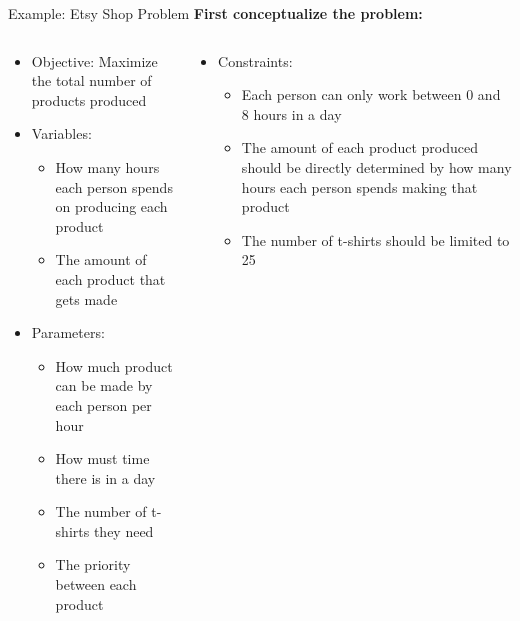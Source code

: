 \documentclass[10pt, aspectratio=169]{beamer}
\begin{document}
\begin{frame}{Example: Etsy Shop Problem}
    \textbf{First conceptualize the problem:}
    \begin{columns}[t]
        \begin{column}[t]{0.5\textwidth}
            \begin{itemize}
                \item Objective: Maximize the total number of products produced
                \item Variables: 
                \begin{itemize}
                    \item How many hours each person spends on producing each product
                    \item The amount of each product that gets made
                \end{itemize}
                
                \item Parameters: 
                \begin{itemize}
                    \item How much product can be made by each person per hour
                    \item How must time there is in a day
                    \item The number of t-shirts they need
                    \item The priority between each product
                \end{itemize}
            \end{itemize}
        \end{column}
        \begin{column}[t]{0.5\textwidth}
            \begin{itemize}
                \item Constraints:
                \begin{itemize}
                    \item Each person can only work between 0 and 8 hours in a day
                    \item The amount of each product produced should be directly determined by how many hours each person spends making that product
                    \item The number of t-shirts should be limited to 25
                \end{itemize}
            \end{itemize}
        \end{column}
    \end{columns}
\end{frame}
\end{document}
